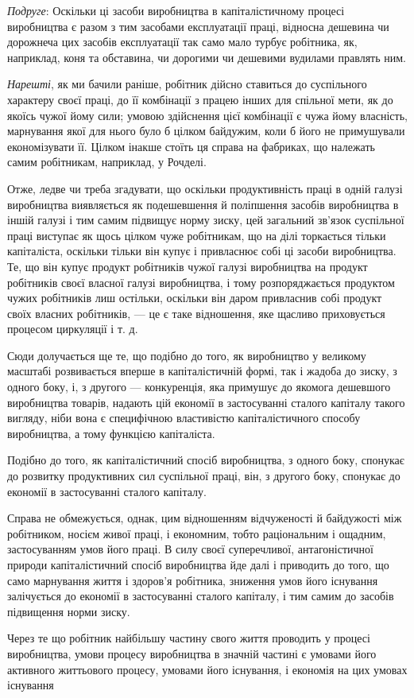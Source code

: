 \emph{Подруге}: Оскільки ці засоби виробництва в капіталістичному
процесі виробництва є разом з тим засобами експлуатації праці,
відносна дешевина чи дорожнеча цих засобів експлуатації так
само мало турбує робітника, як, наприклад, коня та обставина,
чи дорогими чи дешевими вудилами правлять ним.

\emph{Нарешті}, як ми бачили раніше, робітник дійсно ставиться
до суспільного характеру своєї праці, до її комбінації з працею
інших для спільної мети, як до якоїсь чужої йому сили; умовою
здійснення цієї комбінації є чужа йому власність, марнування
якої для нього було б цілком байдужим, коли б його не примушували
економізувати її. Цілком інакше стоїть ця справа
на фабриках, що належать самим робітникам, наприклад, у Рочделі.

Отже, ледве чи треба згадувати, що оскільки продуктивність
праці в одній галузі виробництва виявляється як подешевшення
й поліпшення засобів виробництва в іншій галузі і тим самим
підвищує норму зиску, цей загальний зв’язок суспільної праці
виступає як щось цілком чуже робітникам, що на ділі торкається
тільки капіталіста, оскільки тільки він купує і привласнює
собі ці засоби виробництва. Те, що він купує продукт робітників чужої галузі виробництва на продукт
робітників своєї власної галузі виробництва, і тому розпоряджається продуктом чужих робітників лиш
остільки, оскільки він даром привласнив собі продукт своїх власних робітників, — це є таке
відношення,
яке щасливо приховується процесом циркуляції і т. д.

Сюди долучається ще те, що подібно до того, як виробництво у великому масштабі розвивається вперше в
капіталістичній формі, так і жадоба до зиску, з одного боку, і, з другого — конкуренція, яка
примушує до якомога дешевшого виробництва товарів, надають цій економії в застосуванні сталого
капіталу такого вигляду, ніби вона є специфічною властивістю
капіталістичного способу виробництва, а тому функцією капіталіста.

Подібно до того, як капіталістичний спосіб виробництва,
з одного боку, спонукає до розвитку продуктивних сил суспільної праці, він, з другого боку, спонукає
до економії в застосуванні сталого капіталу.

Справа не обмежується, однак, цим відношенням відчуженості
й байдужості між робітником, носієм живої праці, і економним,
тобто раціональним і ощадним, застосуванням умов його праці.
В силу своєї суперечливої, антагоністичної природи капіталістичний спосіб виробництва йде далі і
приводить до того, що само
марнування життя і здоров’я робітника, зниження умов його
існування залічується до економії в застосуванні сталого капіталу, і тим самим до засобів підвищення
норми зиску.

Через те що робітник найбільшу частину свого життя проводить у процесі виробництва, умови процесу
виробництва
в значній частині є умовами його активного життьового процесу, умовами його існування, і економія на
цих умовах існування
\parbreak{}  %
